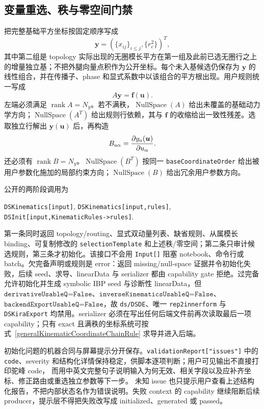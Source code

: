 ﻿\documentclass[a4paper,11pt]{article}
\begin{document}
\subsection{变量重选、秩与零空间门禁}

把完整基础平方坐标按固定顺序写成
\begin{equation}
 \bm y=(\{x_{ij}\}_{i\le j},\{r_e^2\})^T,
\end{equation}
其中第二组是 topology 实际出现的无圈模长平方在第一组及此前已选无圈行之上的增量独立基；不把外腿向量点积作为公开坐标。每个未入基候选仍保存为 $\bm y$ 的线性组合，并在传播子、phase 和显式系数中以该组合的平方根出现。用户规则统一写成
\begin{equation}
 A\bm y=\bm f(\bm u).
 \label{kinematicRuleMatrix}
\end{equation}
左端必须满足 $\operatorname{rank}A=N_y$。若不满秩，$\operatorname{NullSpace}(A)$ 给出未覆盖的基础动力学方向；$\operatorname{NullSpace}(A^T)$ 给出规则行依赖，其与 $\bm f$ 的收缩给出一致性残差。选取独立行解出 $\bm y(\bm u)$ 后，再构造
\begin{equation}
 B_{a\alpha}={\partial y_a(\bm u)\over\partial u_\alpha}.
\end{equation}
还必须有 $\operatorname{rank}B=N_y$。$\operatorname{NullSpace}(B^T)$ 按同一 \texttt{baseCoordinateOrder} 给出被用户参数化施加的局部约束方向；$\operatorname{NullSpace}(B)$ 给出冗余用户参数方向。

公开的两阶段调用为
\begin{center}
 \texttt{DSKinematics[input]},\qquad
 \texttt{DSKinematics[input,rules]},\\
 \texttt{DSInit[input,KinematicRules->rules]}.
\end{center}
第一条同时返回 topology/routing、显式双动量列表、缺省规则、从属模长 binding、可复制修改的 \texttt{selectionTemplate} 和上述秩/零空间；第二条只审计候选规则，第三条才初始化。该接口不会用 \texttt{Input[]} 阻塞 notebook、命令行或 batch。欠完备声明或规则是 error：返回 missing/null-space 证据并令初始化失败，后续 seed、求导、linearData 与 serializer 都由 capability gate 拒绝。过完备允许初始化并生成 symbolic IBP seed 与诊断性 linearData，但 $\texttt{derivativeUsableQ=False}$、$\texttt{inverseKinematicsUsableQ=False}$、$\texttt{backendExportUsableQ=False}$，故 \texttt{ds/DSDE}、唯一 \texttt{rep2innerform} 与 \texttt{DSKiraExport} 均禁用。serializer 必须在写出任何后端文件前再次读取最后一项 capability；只有 exact 且满秩的坐标系统可按式~\eqref{generalKinematicCoordinateChainRule} 求导并进入后端。

初始化问题的机器合同与屏幕提示分开保存。\texttt{validationReport["issues"]} 中的
\texttt{code}、severity 和结构化详情保持稳定，供脚本逐项判断；用户可见输出不直接打印驼峰 code，
而用中英文完整句子说明输入为何无效、相关字段以及应补齐坐标、修正路由或重选独立参数等下一步。
未知 issue 也只提示用户查看上述结构化报告，不把内部状态名作为错误说明。失败 context 的 capability
继续阻断后续 producer，提示层不得把失败改写成 initialized、generated 或 passed。
\end{document}
